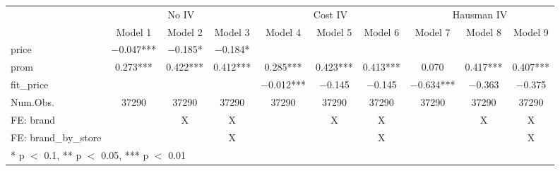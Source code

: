 \begin{table}
\centering
\begin{tabular}[t]{lccccccccc}
\toprule
\multicolumn{1}{c}{ } & \multicolumn{3}{c}{No IV} & \multicolumn{3}{c}{Cost IV} & \multicolumn{3}{c}{Hausman IV} \\
\cmidrule(l{3pt}r{3pt}){2-4} \cmidrule(l{3pt}r{3pt}){5-7} \cmidrule(l{3pt}r{3pt}){8-10}
  & Model 1 & Model 2 & Model 3 & Model 4 & Model 5 & Model 6 & Model 7 & Model 8 & Model 9\\
\midrule
price & \num{-0.047}*** & \num{-0.185}* & \num{-0.184}* &  &  &  &  &  & \\
prom & \num{0.273}*** & \num{0.422}*** & \num{0.412}*** & \num{0.285}*** & \num{0.423}*** & \num{0.413}*** & \num{0.070} & \num{0.417}*** & \num{0.407}***\\
fit\_price &  &  &  & \num{-0.012}*** & \num{-0.145} & \num{-0.145} & \num{-0.634}*** & \num{-0.363} & \num{-0.375}\\
\midrule
Num.Obs. & \num{37290} & \num{37290} & \num{37290} & \num{37290} & \num{37290} & \num{37290} & \num{37290} & \num{37290} & \num{37290}\\
FE: brand &  & X & X &  & X & X &  & X & X\\
FE: brand_by_store &  &  & X &  &  & X &  &  & X\\
\bottomrule
\multicolumn{10}{l}{\rule{0pt}{1em}* p $<$ 0.1, ** p $<$ 0.05, *** p $<$ 0.01}\\
\end{tabular}
\end{table}
